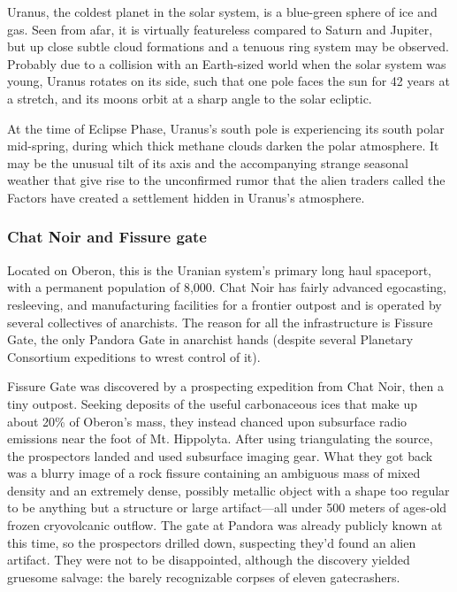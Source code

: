 Uranus, the coldest planet in the solar system, is a blue-green sphere of ice and gas. Seen from afar, it is virtually featureless compared to Saturn and Jupiter, but up close subtle cloud formations and a tenuous ring system may be observed. Probably due to a collision with an Earth-sized world when the solar system was young, Uranus rotates on its side, such that one pole faces the sun for 42 years at a stretch, and its moons orbit at a sharp angle to the solar ecliptic. 

At the time of Eclipse Phase, Uranus's south pole is experiencing its south polar mid-spring, during which thick methane clouds darken the polar atmosphere. It may be the unusual tilt of its axis and the accompanying strange seasonal weather that give rise to the unconfirmed rumor that the alien traders called the Factors have created a settlement hidden in Uranus's atmosphere. 

\subsubsection{Chat Noir and Fissure gate} \label{sec:chat-noir-fissure} 

Located on Oberon, this is the Uranian system's primary long haul spaceport, with a permanent population of 8,000. Chat Noir has fairly advanced egocasting, resleeving, and manufacturing facilities for a frontier outpost and is operated by several collectives of anarchists. The reason for all the infrastructure is Fissure Gate, the only Pandora Gate in anarchist hands (despite several Planetary Consortium expeditions to wrest control of it). 

Fissure Gate was discovered by a prospecting expedition from Chat Noir, then a tiny outpost. Seeking deposits of the useful carbonaceous ices that make up about 20\% of Oberon's mass, they instead chanced upon subsurface radio emissions near the foot of Mt. Hippolyta. After using triangulating the source, the prospectors landed and used subsurface imaging gear. What they got back was a blurry image of a rock fissure containing an ambiguous mass of mixed density and an extremely dense, possibly metallic object with a shape too regular to be anything but a structure or large artifact—all under 500 meters of ages-old frozen cryovolcanic outflow. The gate at Pandora was already publicly known at this time, so the prospectors drilled down, suspecting they'd found an alien artifact. They were not to be disappointed, although the discovery yielded gruesome salvage: the barely recognizable corpses of eleven gatecrashers. 

